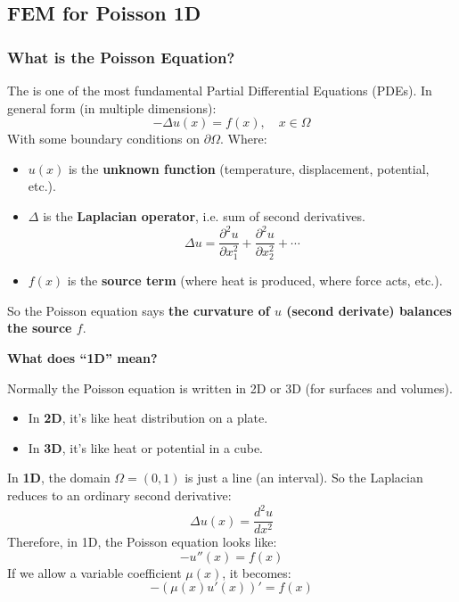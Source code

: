 \subsection{FEM for Poisson 1D}\label{subsection: FEM for Poisson 1D}

\subsubsection{What is the Poisson Equation?}

The  is one of the most fundamental Partial Differential Equations (PDEs). In general form (in multiple dimensions):
\begin{equation}
    - \Delta u(x) = f(x), \quad x \in \Omega
\end{equation}
With some boundary conditions on $\partial \Omega$. Where:
\begin{itemize}
    \item $u(x)$ is the \textbf{unknown function} (temperature, displacement, potential, etc.).
    \item $\Delta$ is the \textbf{Laplacian operator}, i.e. sum of second derivatives.
    \begin{equation}
        \Delta u = \dfrac{\partial^{2} u}{\partial x_{1}^{2}} + \dfrac{\partial^{2} u}{\partial x_{2}^{2}} + \cdots
    \end{equation}
    \item $f(x)$ is the \textbf{source term} (where heat is produced, where force acts, etc.).
\end{itemize}
So the Poisson equation says \textbf{the curvature of $u$ (second derivate) balances the source $f$}.

\highspace
\begin{flushleft}
    \textcolor{Green3}{ \textbf{What does ``1D'' mean?}}
\end{flushleft}
Normally the Poisson equation is written in 2D or 3D (for surfaces and volumes).
\begin{itemize}
    \item In \textbf{2D}, it's like heat distribution on a plate.
    \item In \textbf{3D}, it's like heat or potential in a cube.
\end{itemize}
In \textbf{1D}, the domain $\Omega = (0,1)$ is just a line (an interval). So the Laplacian reduces to an ordinary second derivative:
\begin{equation*}
    \Delta u(x) = \frac{d^2 u}{dx^2}
\end{equation*}
Therefore, in 1D, the Poisson equation looks like:
\begin{equation}
    - u''(x) = f(x)    
\end{equation}
If we allow a variable coefficient $\mu(x)$, it becomes:
\begin{equation*}
    - \left(\mu(x) u'(x)\right)' = f(x)    
\end{equation*}


